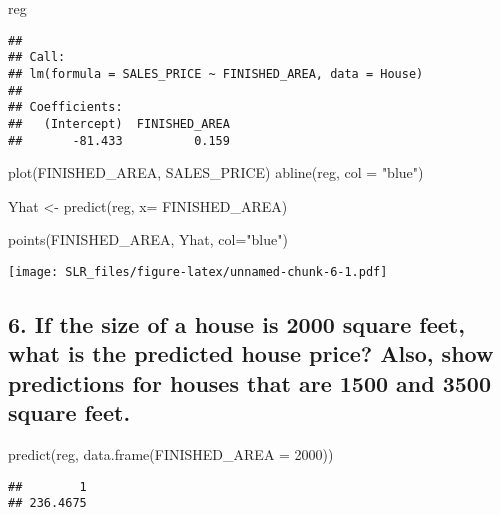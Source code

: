 \documentclass[
]{article}
\newenvironment{Shaded}{\begin{snugshade}}{\end{snugshade}}
\newcommand{\AttributeTok}[1]{\textcolor[rgb]{0.77,0.63,0.00}{#1}}
\newcommand{\DecValTok}[1]{\textcolor[rgb]{0.00,0.00,0.81}{#1}}
\newcommand{\FunctionTok}[1]{\textcolor[rgb]{0.00,0.00,0.00}{#1}}
\newcommand{\NormalTok}[1]{#1}
\newcommand{\OtherTok}[1]{\textcolor[rgb]{0.56,0.35,0.01}{#1}}
\newcommand{\StringTok}[1]{\textcolor[rgb]{0.31,0.60,0.02}{#1}}
\begin{document}
\begin{Shaded}
\begin{Highlighting}[]
\NormalTok{reg}
\end{Highlighting}
\end{Shaded}

\begin{verbatim}
## 
## Call:
## lm(formula = SALES_PRICE ~ FINISHED_AREA, data = House)
## 
## Coefficients:
##   (Intercept)  FINISHED_AREA  
##       -81.433          0.159
\end{verbatim}

\begin{Shaded}
\begin{Highlighting}[]
\FunctionTok{plot}\NormalTok{(FINISHED\_AREA, SALES\_PRICE)}
\FunctionTok{abline}\NormalTok{(reg, }\AttributeTok{col =} \StringTok{"blue"}\NormalTok{)}

\NormalTok{Yhat }\OtherTok{\textless{}{-}} \FunctionTok{predict}\NormalTok{(reg, }\AttributeTok{x=}\NormalTok{ FINISHED\_AREA)}

\FunctionTok{points}\NormalTok{(FINISHED\_AREA, Yhat, }\AttributeTok{col=}\StringTok{"blue"}\NormalTok{)}
\end{Highlighting}
\end{Shaded}

\texttt{[image: SLR\_files/figure-latex/unnamed-chunk-6-1.pdf]}

\hypertarget{if-the-size-of-a-house-is-2000-square-feet-what-is-the-predicted-house-price-also-show-predictions-for-houses-that-are-1500-and-3500-square-feet.}{%
\subsection{6. If the size of a house is 2000 square feet, what is the
predicted house price? Also, show predictions for houses that are 1500
and 3500 square
feet.}\label{if-the-size-of-a-house-is-2000-square-feet-what-is-the-predicted-house-price-also-show-predictions-for-houses-that-are-1500-and-3500-square-feet.}}

\begin{Shaded}
\begin{Highlighting}[]
\FunctionTok{predict}\NormalTok{(reg, }\FunctionTok{data.frame}\NormalTok{(}\AttributeTok{FINISHED\_AREA =} \DecValTok{2000}\NormalTok{))}
\end{Highlighting}
\end{Shaded}

\begin{verbatim}
##        1 
## 236.4675
\end{verbatim}
\end{document}
